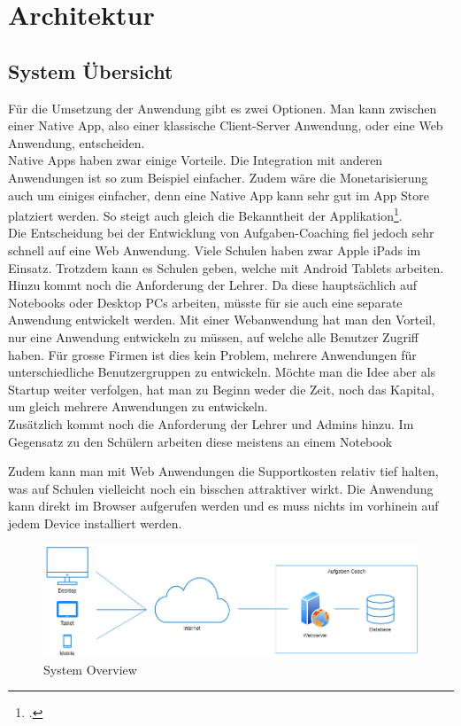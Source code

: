 \section{Architektur}
\subsection{System Übersicht}
Für die Umsetzung der Anwendung gibt es zwei Optionen. Man kann zwischen einer Native App, also einer klassische Client-Server Anwendung, oder eine Web Anwendung, entscheiden. \\

Native Apps haben zwar einige Vorteile. Die Integration mit anderen Anwendungen ist so zum Beispiel einfacher. Zudem wäre die Monetarisierung auch um einiges einfacher, denn eine Native App kann sehr gut im App Store platziert werden. So steigt auch gleich die Bekanntheit der Applikation\footcite{native_app}. \\

Die Entscheidung bei der Entwicklung von Aufgaben-Coaching fiel jedoch sehr schnell auf eine Web Anwendung. Viele Schulen haben zwar Apple iPads im Einsatz. Trotzdem kann es Schulen geben, welche mit Android Tablets arbeiten. Hinzu kommt noch die Anforderung der Lehrer. Da diese hauptsächlich auf Notebooks oder Desktop PCs arbeiten, müsste für sie auch eine separate Anwendung entwickelt werden. Mit einer Webanwendung hat man den Vorteil, nur eine Anwendung entwickeln zu müssen, auf welche alle Benutzer Zugriff haben. Für grosse Firmen ist dies kein Problem, mehrere Anwendungen für unterschiedliche Benutzergruppen zu entwickeln. Möchte man die Idee aber als Startup weiter verfolgen, hat man zu Beginn weder die Zeit, noch das Kapital, um gleich mehrere Anwendungen zu entwickeln. \\

Zusätzlich kommt noch die Anforderung der Lehrer und Admins hinzu. Im Gegensatz zu den Schülern arbeiten diese meistens an einem Notebook

Zudem kann man mit Web Anwendungen die Supportkosten relativ tief halten, was auf Schulen vielleicht noch ein bisschen attraktiver wirkt. Die Anwendung kann direkt im Browser aufgerufen werden und es muss nichts im vorhinein auf jedem Device installiert werden.

\begin{figure}[H]
\begin{center}
	\includegraphics[width=\textwidth, keepaspectratio]{images/system_overview.png}
	\caption{System Overview}
	\label{fig:system_overview}
\end{center}
\end{figure}


